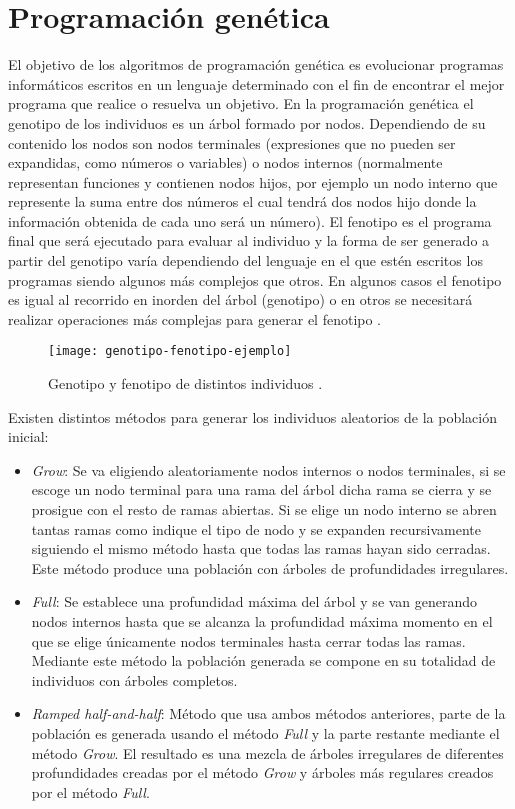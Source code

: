 \section{Programación genética}
El objetivo de los algoritmos de programación genética es evolucionar programas informáticos escritos en un lenguaje determinado con el fin de encontrar el mejor programa que realice o resuelva un objetivo. En la programación genética el genotipo de los individuos es un árbol formado por nodos. Dependiendo de su contenido los nodos son nodos terminales (expresiones que no pueden ser expandidas, como números o variables) o nodos internos (normalmente representan funciones y contienen nodos hijos, por ejemplo un nodo interno que represente la suma entre dos números el cual tendrá dos nodos hijo donde la información obtenida de cada uno será un número). El fenotipo es el programa final que será ejecutado para evaluar al individuo y la forma de ser generado a partir del genotipo varía dependiendo del lenguaje en el que estén escritos los programas siendo algunos más complejos que otros. En algunos casos el fenotipo es igual al recorrido en inorden del árbol (genotipo) o en otros se necesitará realizar operaciones más complejas para generar el fenotipo \cite{cervigon09}.
\begin{figure}[H]
\centering
\texttt{[image: genotipo-fenotipo-ejemplo]}
\caption{Genotipo y fenotipo de distintos individuos \cite{colmenarApuntes}.}
\end{figure}

Existen distintos métodos para generar los individuos aleatorios de la población inicial:
\begin{itemize}
\item \textit{Grow}: Se va eligiendo aleatoriamente nodos internos o nodos terminales, si se escoge un nodo terminal para una rama del árbol dicha rama se cierra y se prosigue con el resto de ramas abiertas. Si se elige un nodo interno se abren tantas ramas como indique el tipo de nodo y se expanden recursivamente siguiendo el mismo método hasta que todas las ramas hayan sido cerradas. Este método produce una población con árboles de profundidades irregulares.

\item \textit{Full}: Se establece una profundidad máxima del árbol y se van generando nodos internos hasta que se alcanza la profundidad máxima momento en el que se elige únicamente nodos terminales hasta cerrar todas las ramas. Mediante este método la población generada se compone en su totalidad de individuos con árboles completos.

\item \textit{Ramped half-and-half}: Método que usa ambos métodos anteriores, parte de la población es generada usando el método \textit{Full} y la parte restante mediante el método \textit{Grow}. El resultado es una mezcla de árboles irregulares de diferentes profundidades creadas por el método \textit{Grow} y árboles más regulares creados por el método \textit{Full}.
\end{itemize}

